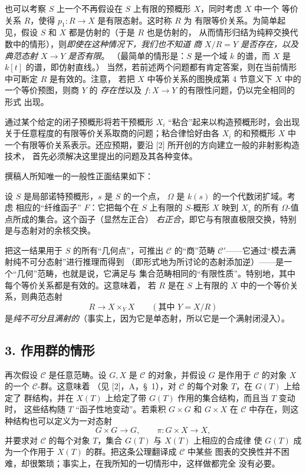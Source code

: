 也可以考察 $S$ 上一个不再假设在 $S$ 上有限的预概形 $X$，同时考虑 $X$ 中一个
等价关系 $R$，使得 $p_1:R\longrightarrow X$ 是有限态射。这时称 $R$ 为
有限等价关系。为简单起见，假设 $S$ 和 $X$ 都是仿射的（于是 $R$ 也是仿射的，
从而情形归结为纯粹交换代数中的情形），则\emph{即使在这种情况下，我们也不知道
商 $X/R=Y$ 是否存在，以及典范态射 $X\longrightarrow Y$ 是否有限}。
（最简单的情形是：$S$ 是一个域 $k$ 的谱，而 $X$ 是 $k[t]$ 的谱，即仿射直线。）
当然，若前述两个问题都有肯定答案，则在当前情形中可断定 $R$ 是有效的。注意，
若把 $X$ 中等价关系的图换成第 4 节意义下 $X$ 中的一个等价预图，则商 $Y$ 的
\emph{存在性}以及 $f:X\longrightarrow Y$ 的有限性问题，仍以完全相同的形式
出现。

通过某个给定的闭子预概形将若干预概形 $X_i$ “粘合”起来以构造预概形时，会出现
关于任意程度的有限等价关系取商的问题；粘合律恰好由各 $X_i$ 的和预概形 $X$ 中
一个有限等价关系表示。还应预期，要沿 [2] 所开创的方向建立一般的非射影构造技术，
首先必须解决这里提出的问题及其各种变体。

撰稿人所知唯一的一般性正面结果如下：

 设 $S$ 是局部诺特预概形，$s$ 是 $S$ 的一个点，
$\Omega$ 是 $k(s)$ 的一个代数闭扩域。考虑
相应的“纤维函子” $F$：它把每个在 $S$ 上有限的 $S$-概形 $X$
映到 $X_s$ 的所有 $\Omega$-值点所成的集合。这个函子（显然左正合）
\emph{右正合}，即它与有限直极限交换，特别是与态射对的余核交换。

把这一结果用于 $S$ 的所有“几何点”，可推出 $\mathcal C$ 的“商”范畴
$\mathcal C'$——它通过“模去满射纯不可分态射”进行推理而得到
（即形式地为所讨论的态射添加逆）——是一个“几何”范畴，也就是说，它满足与
集合范畴相同的“有限性质”。特别地，其中每个等价关系都是有效的。这意味着，
若 $R$ 是在 $S$ 上有限的 $X$ 中的一个等价关系，则典范态射
\[
  R\longrightarrow X\times_Y X\qquad (\text{其中 }Y=X/R)
\]
是\emph{纯不可分且满射的}（事实上，因为它是单态射，所以它是一个满射闭浸入）。

\subsection*{3. 作用群的情形}

再次假设 $\mathcal C$ 是任意范畴。设 $G,X$ 是 $\mathcal C$ 的对象，并假设
$G$ 是作用于 $\mathcal C$ 的对象 $X$ 的一个 $\mathcal C$-群。这意味着
（见 [2]，A，\S~1），对 $\mathcal C$ 的每个对象 $T$，在 $G(T)$ 上给定了
群结构，并在 $X(T)$ 上给定了带 $G(T)$ 作用的集合结构，而且当 $T$ 变动时，
这些结构随 $T$ “函子性地变动”。若乘积 $G\times G$ 和 $G\times X$ 在
$\mathcal C$ 中存在，则这种结构也可以定义为一对态射
\[
  G\times G\longrightarrow G,
  \qquad \pi:G\times X\longrightarrow X,
\]
并要求对 $\mathcal C$ 的每个对象 $T$，集合 $G(T)$ 与 $X(T)$ 上相应的合成律
使 $G(T)$ 成为一个作用于 $X(T)$ 的群。把这条公理翻译成 $\mathcal C$ 中某些
图表的交换性并不困难，却很繁琐；事实上，在我所知的一切情形中，这样做都完全
没有必要。

